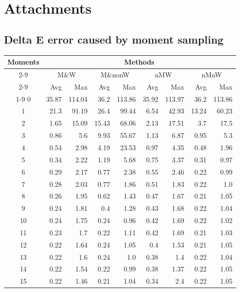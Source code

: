 \chapter{Attachments}

\section{Delta E error caused by moment sampling} \label{sec:completeMomentError}

\begin{table}[h]
	\centering
	\begin{tabular}{crrrrrrrr}
		\toprule
		\multirow{4}{*}{Moments} &
		\multicolumn{8}{c}{Methods} \\
		\cmidrule(lr){2-9}
		&\multicolumn{2}{c}{M\&W} &
		\multicolumn{2}{c}{M\&nonW} &
		\multicolumn{2}{c}{nMW} &
		\multicolumn{2}{c}{nMnW}\\
		\cmidrule(lr){2-9}
		& Avg & Max & Avg & Max & Avg & Max & Avg & Max \\
		\cmidrule(lr){1-9}
		0&35.87&114.04&36.2&113.86&35.92&113.97&36.2&113.86\\
		1&21.3&91.19&26.4&99.44&6.54&42.93&13.24&60.23\\
		2&1.65&15.09&15.43&68.06&2.13&17.51&3.7&17.5\\
		3&0.86&5.6&9.93&55.67&1.13&6.87&0.95&5.3\\
		4&0.54&2.98&4.19&23.53&0.97&4.35&0.48&1.96\\
		5&0.34&2.22&1.19&5.68&0.75&3.37&0.31&0.97\\
		6&0.29&2.17&0.77&2.38&0.55&2.46&0.22&0.99\\
		7&0.28&2.03&0.77&1.86&0.51&1.83&0.22&1.0\\
		8&0.26&1.95&0.62&1.43&0.47&1.67&0.21&1.05\\
		9&0.24&1.81&0.4&1.28&0.43&1.68&0.22&1.04\\
		10&0.24&1.75&0.24&0.96&0.42&1.69&0.22&1.02\\
		11&0.23&1.7&0.22&1.11&0.42&1.69&0.21&1.03\\
		12&0.22&1.64&0.24&1.05&0.4&1.53&0.21&1.05\\
		13&0.22&1.6&0.24&1.0&0.38&1.4&0.22&1.04\\
		14&0.22&1.54&0.22&0.99&0.38&1.37&0.22&1.05\\
		15&0.22&1.46&0.21&1.04&0.34&2.4&0.22&1.05\\
		\bottomrule
	\end{tabular}
	\label{table:completeMomentError}
\end{table}